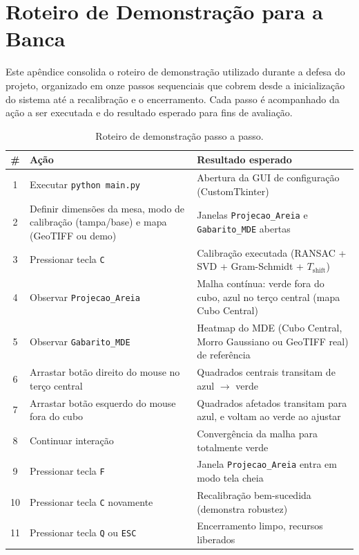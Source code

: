 
\chapter{Roteiro de Demonstração para a Banca}
\label{ap:roteiro}

Este apêndice consolida o roteiro de demonstração utilizado durante a
defesa do projeto, organizado em onze passos sequenciais que cobrem
desde a inicialização do sistema até a recalibração e o encerramento.
Cada passo é acompanhado da ação a ser executada e do resultado
esperado para fins de avaliação.

\begin{table}[!ht]
\centering
\caption{Roteiro de demonstração passo a passo.}
\label{tab:roteiro}
\small
\begin{tabularx}{\textwidth}{@{}c X X@{}}
\toprule
\textbf{\#} & \textbf{Ação} & \textbf{Resultado esperado} \\
\midrule
1  & Executar \texttt{python main.py}             & Abertura da GUI de configuração (CustomTkinter) \\
2  & Definir dimensões da mesa, modo de calibração (tampa/base) e mapa (GeoTIFF ou demo) & Janelas \texttt{Projecao\_Areia} e \texttt{Gabarito\_MDE} abertas \\
3  & Pressionar tecla \texttt{C}                  & Calibração executada (RANSAC + SVD + Gram-Schmidt + $T_{\text{shift}}$) \\
4  & Observar \texttt{Projecao\_Areia}            & Malha contínua: verde fora do cubo, azul no terço central (mapa Cubo Central) \\
5  & Observar \texttt{Gabarito\_MDE}              & Heatmap do MDE (Cubo Central, Morro Gaussiano ou GeoTIFF real) de referência \\
6  & Arrastar botão direito do mouse no terço central & Quadrados centrais transitam de azul $\to$ verde \\
7  & Arrastar botão esquerdo do mouse fora do cubo & Quadrados afetados transitam para azul, e voltam ao verde ao ajustar \\
8  & Continuar interação                          & Convergência da malha para totalmente verde \\
9  & Pressionar tecla \texttt{F}                  & Janela \texttt{Projecao\_Areia} entra em modo tela cheia \\
10 & Pressionar tecla \texttt{C} novamente        & Recalibração bem-sucedida (demonstra robustez) \\
11 & Pressionar tecla \texttt{Q} ou \texttt{ESC}  & Encerramento limpo, recursos liberados \\
\bottomrule
\end{tabularx}
\end{table}

